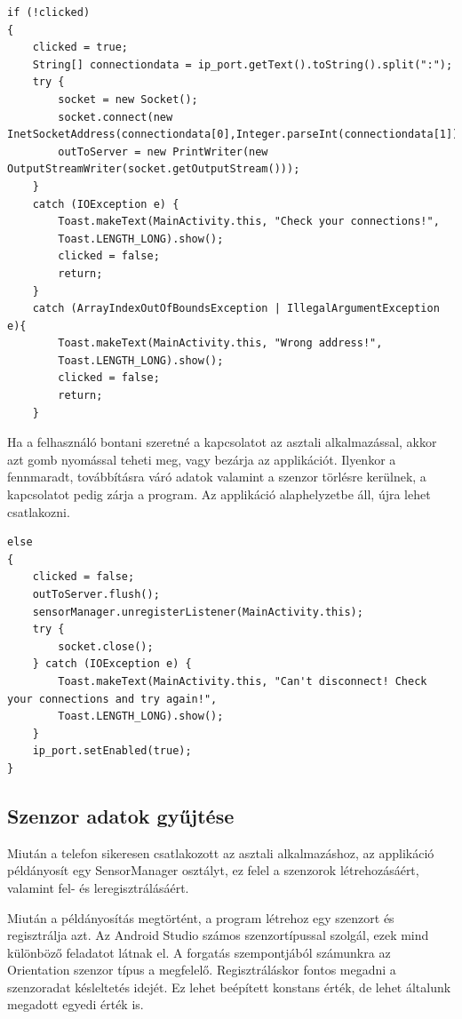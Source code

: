 \documentclass[
]{thesis-ekf}
\theoremstyle{definition}
\theoremstyle{remark}
\begin{document}
\begin{lstlisting}[caption={Csatlakozás az asztali alkalmazáshoz}]
if (!clicked)
{
	clicked = true;
	String[] connectiondata = ip_port.getText().toString().split(":");
	try {
		socket = new Socket();
		socket.connect(new InetSocketAddress(connectiondata[0],Integer.parseInt(connectiondata[1])),100);
		outToServer = new PrintWriter(new OutputStreamWriter(socket.getOutputStream()));
	}
	catch (IOException e) {
		Toast.makeText(MainActivity.this, "Check your connections!",
		Toast.LENGTH_LONG).show();
		clicked = false;
		return;
	}
	catch (ArrayIndexOutOfBoundsException | IllegalArgumentException e){
		Toast.makeText(MainActivity.this, "Wrong address!",
		Toast.LENGTH_LONG).show();
		clicked = false;
		return;
	}
\end{lstlisting}

Ha a felhasználó bontani szeretné a kapcsolatot az asztali alkalmazással, akkor azt gomb nyomással teheti meg, vagy bezárja az applikációt. Ilyenkor a fennmaradt, továbbításra váró adatok valamint a szenzor törlésre kerülnek, a kapcsolatot pedig zárja a program. Az applikáció alaphelyzetbe áll, újra lehet csatlakozni. 

\begin{lstlisting}[caption={Kapcsolat bontása az asztali alkalmazással}]
else
{
	clicked = false;
	outToServer.flush();
	sensorManager.unregisterListener(MainActivity.this);
	try {
		socket.close();
	} catch (IOException e) {
		Toast.makeText(MainActivity.this, "Can't disconnect! Check your connections and try again!",
		Toast.LENGTH_LONG).show();
	}
	ip_port.setEnabled(true);
}
\end{lstlisting}

\subsection{Szenzor adatok gyűjtése}
Miután a telefon sikeresen csatlakozott az asztali alkalmazáshoz, az applikáció példányosít egy SensorManager osztályt, ez felel a szenzorok létrehozásáért, valamint fel- és leregisztrálásáért.

Miután a példányosítás megtörtént, a program létrehoz egy szenzort és regisztrálja azt. Az Android Studio számos szenzortípussal szolgál, ezek mind különböző feladatot látnak el. A forgatás szempontjából számunkra az Orientation szenzor típus a megfelelő. Regisztráláskor fontos megadni a szenzoradat késleltetés idejét. Ez lehet beépített konstans érték, de lehet általunk megadott egyedi érték is. 
\end{document}
